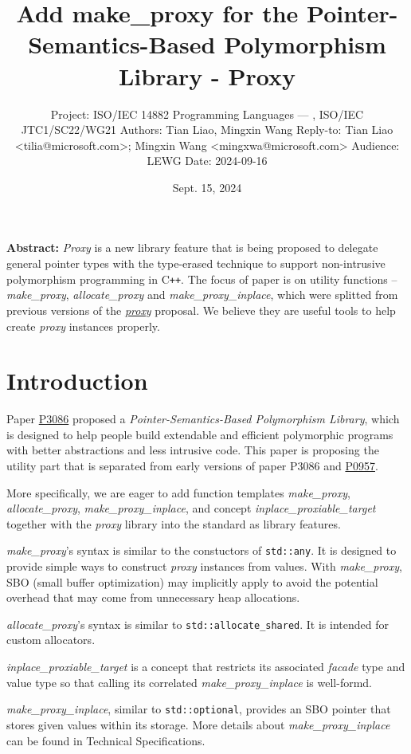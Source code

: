 \documentclass[10pt, a4paper, oneside]{article}
\title{Add make\_proxy for the Pointer-Semantics-Based
Polymorphism Library - Proxy}
\date{Sept. 15, 2024}
\author{%
\medbreak
Project: ISO/IEC 14882 Programming Languages — \Cpp{}, ISO/IEC JTC1/SC22/WG21\smallbreak
Authors: Tian Liao, Mingxin Wang\smallbreak
Reply-to: Tian Liao \textless tilia@microsoft.com\textgreater; Mingxin Wang \textless mingxwa@microsoft.com\textgreater \smallbreak
Audience: LEWG\smallbreak
Date: 2024-09-16
}
\makeatletter
\newcommand{\Cpp}{C\texttt{++}}
\renewcommand{\maketitle}{\bgroup\setlength{\parindent}{0pt}
\begin{flushleft}
  \textbf{\huge \@title}

  \@author
\end{flushleft}\egroup
}
\makeatother
\begin{document}
\maketitle

\textbf{Abstract:} \textit{Proxy} is a new library feature that is being proposed to delegate general pointer types
with the type-erased technique to support non-intrusive polymorphism programming in \Cpp.
The focus of paper is on utility functions -- \textit{make\_proxy}, \textit{allocate\_proxy} and \textit{make\_proxy\_inplace},
which were splitted from previous versions of the \href{https://wg21.link/p3086r1}{\textit{proxy}} proposal.
We believe they are useful tools to help create \textit{proxy} instances properly.

\section{Introduction}

Paper \href{https://wg21.link/p3086}{P3086} proposed a \textit{Pointer-Semantics-Based Polymorphism Library},
which is designed to help people build extendable and efficient polymorphic programs with better abstractions and less intrusive code.
This paper is proposing the utility part that is separated from early versions of paper P3086 and \href{https://wg21.link/p0957}{P0957}.

More specifically, we are eager to add function templates \textit{make\_proxy}, \textit{allocate\_proxy}, \textit{make\_proxy\_inplace},
and concept \textit{inplace\_proxiable\_target} together with the \textit{proxy} library into the standard as library features.

\textit{make\_proxy}'s syntax is similar to the constuctors of \verb|std::any|.
It is designed to provide simple ways to construct \textit{proxy} instances from values.
With \textit{make\_proxy}, SBO (small buffer optimization) may implicitly apply to avoid the potential overhead that may come from unnecessary heap allocations.

\textit{allocate\_proxy}'s syntax is similar to \verb|std::allocate_shared|. It is intended for custom allocators.

\textit{inplace\_proxiable\_target} is a concept that restricts its associated \textit{facade} type and value type
so that calling its correlated \textit{make\_proxy\_inplace} is well-formd.

\textit{make\_proxy\_inplace}, similar to \verb|std::optional|,
provides an SBO pointer that stores given values within its storage.
More details about \textit{make\_proxy\_inplace} can be found in Technical Specifications.
\end{document}
